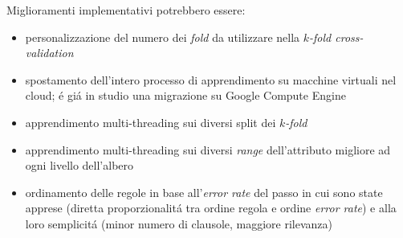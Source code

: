 \documentclass[preprint]{acm_proc_article-sp}
\begin{document}
Miglioramenti implementativi potrebbero essere:
\begin{itemize}
\item personalizzazione del numero dei \textit{fold} da utilizzare nella $k$\textit{-fold cross-validation}
\item spostamento dell'intero processo di apprendimento su macchine virtuali nel cloud; \'e gi\'a in studio una migrazione su Google Compute Engine
\item apprendimento multi-threading sui diversi split dei $k$\textit{-fold}
\item apprendimento multi-threading sui diversi \textit{range} dell'attributo migliore ad ogni livello dell'albero 
\item ordinamento delle regole in base all'\textit{error rate} del passo in cui sono state apprese (diretta proporzionalit\'a tra ordine regola e ordine \textit{error rate}) e alla loro semplicit\'a (minor numero di clausole, maggiore rilevanza)
\end{itemize}

%
\balancecolumns

\end{document}
